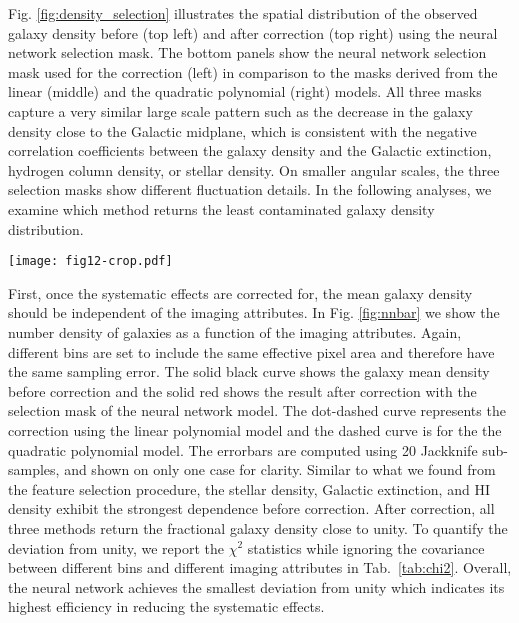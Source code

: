 \documentclass[fleqn, usenatbib]{mnras}
\begin{document}
Fig. \ref{fig:density_selection} illustrates the spatial distribution of the observed galaxy density before (top left) and after correction (top right) using the neural network selection mask. The bottom panels show the neural network selection mask used for the correction (left) in comparison to the masks derived from the linear (middle) and the quadratic polynomial (right) models. All three masks capture a very similar large scale pattern such as the decrease in the galaxy density close to the Galactic midplane, which is consistent with the negative correlation coefficients between the galaxy density and the Galactic extinction, hydrogen column density, or stellar density. On smaller angular scales, the three selection masks show different fluctuation details. In the following analyses, we examine which method returns the least contaminated galaxy density distribution. \\

\begin{figure*}
    \centering
    \texttt{[image: fig12-crop.pdf]}
    \caption{\textit{Top}: the normalized observed galaxy density and corrected density map using the neural network selection mask from left to right, respectively. \textit{Bottom}: the selection masks from the Neural Network, quadratic, and linear polynomial models, respectively from left to right. All three selection masks are able to capture the behavior that the galaxy density systematically drops at the footprint boundaries i.e., high extinction regions.}
    \label{fig:density_selection}
\end{figure*}

First, once the systematic effects are corrected for, the mean galaxy density should be independent of the imaging attributes. In Fig. \ref{fig:nnbar} we show the number density of galaxies as a function of the imaging attributes. Again, different bins are set to include the same effective pixel area and therefore have the same sampling error. The solid black curve shows the galaxy mean density before correction and the solid red shows the result after correction with the selection mask of the neural network model. The dot-dashed curve represents the correction using the linear polynomial model and the dashed curve is for the the quadratic polynomial model. The errorbars are computed using 20 Jackknife sub-samples, and shown on only one case for clarity. Similar to what we found from the feature selection procedure, the stellar density, Galactic extinction, and HI density exhibit the strongest dependence before correction. After correction, all three methods return the fractional galaxy density close to unity. To quantify the deviation from unity, we report the $\chi^{2}$ statistics while ignoring the covariance between different bins and different imaging attributes in Tab.~\ref{tab:chi2}. Overall, the neural network achieves the smallest deviation from unity which indicates its highest efficiency in reducing the systematic effects.\\
\end{document}
